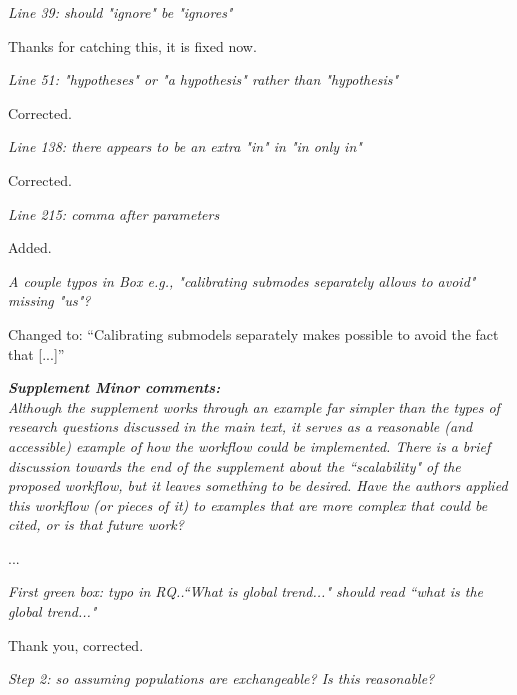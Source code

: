 \documentclass[11pt,letter]{article}
\begin{document}
\begin{mybox}
\emph{Line 39: should "ignore" be "ignores"}
\end{mybox}

Thanks for catching this, it is fixed now. 

\begin{mybox}
\emph{Line 51: "hypotheses" or "a hypothesis" rather than "hypothesis"}
\end{mybox}

Corrected.

\begin{mybox}
\emph{Line 138: there appears to be an extra "in" in "in only in"}
\end{mybox}

Corrected.

\begin{mybox}
\emph{Line 215: comma after parameters}
\end{mybox}

Added.

\begin{mybox}
\emph{A couple typos in Box e.g., "calibrating submodes separately allows to
avoid" missing "us"?}
\end{mybox}

Changed to: ``Calibrating submodels separately makes possible to avoid the fact that [...]''

\begin{mybox}
\emph{\textbf{Supplement Minor comments:}\\
Although the supplement works through an example far simpler than the
types of research questions discussed in the main text, it serves as a
reasonable (and accessible) example of how the workflow could be
implemented. There is a brief discussion towards the end of the
supplement about the ``scalability" of the proposed workflow, but it
leaves something to be desired. Have the authors applied this workflow
(or pieces of it) to examples that are more complex that could be cited,
or is that future work?}
\end{mybox}

... 

\begin{mybox}
\emph{First green box: typo in RQ..``What is global trend..." should read
``what is the global trend..."}
\end{mybox}

Thank you, corrected.

\begin{mybox}
\emph{Step 2: so assuming populations are exchangeable? Is this reasonable?}
\end{mybox}
\end{document}

